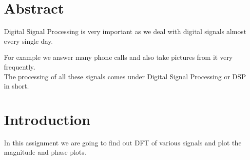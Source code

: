 \documentclass[10pt,english, openany]{book}
\begin{document}
\mainmatter

\chapter{Abstract}
Digital Signal Processing is very important as we deal with digital signals almost every single day.
\par 
For example we answer many phone calls and also take pictures from it very frequently.\\
The processing of all these signals comes under Digital Signal Processing or DSP in short.\\
\begingroup


\chapter{Introduction}

In this assignment we are going to find out DFT of various signals and plot the magnitude and phase plots.

\endgroup
\end{document}
